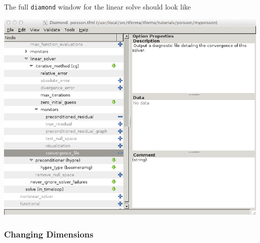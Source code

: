 {\samepage
The full \texttt{diamond} window for the linear solve should look like
\begin{center}
  \includegraphics[width=\diamondwidth]{figures/screendumps/diamond_poisson_cg-hypre.png}
\end{center}
}

\subsubsection{Changing Dimensions}
\label{sec:changing-dimensions}

